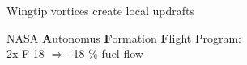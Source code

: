 \documentclass[12pt,svgnames,table,draft=false]{beamer}
\begin{document}
\begin{frame}{}

\vspace{11em}
\flushright
\begin{tcolorbox}[width=.6\textwidth,colback={gray!10!}]  
\centering
Wingtip vortices create local updrafts
\end{tcolorbox}  

\end{frame}

\begin{frame}{}

\vspace{-8em}
\centering
\begin{tcolorbox}[width=.8\textwidth,colback={gray!10!}]  
\centering
NASA \textbf{A}utonomus \textbf{F}ormation \textbf{F}light Program: \\
2x F-18 $\Rightarrow$ -18 \% fuel flow  
\end{tcolorbox}  

\end{frame}
\end{document}
